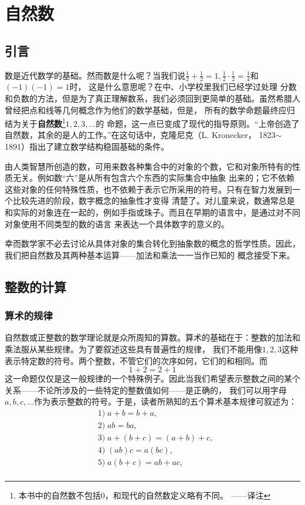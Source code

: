 \chapter{自然数}
\label{chap:natural-number}

\section*{引言}
数是近代数学的基础。然而数是什么呢？当我们说$\frac{1}{2} + \frac{1}{2}= 1,
\frac{1}{2} \cdot \frac{1}{2} = \frac{1}{4}$和$(-1)(-1) = 1$时，
这是什么意思呢？在中、小学校里我们已经学过处理
分数和负数的方法，但是为了真正理解数系，我们必须回到更简单的基础。虽然希腊人曾经把点和线等几何概念作为他们的数学基础，但是，
所有的数学命题最终应归结为关于\textbf{自然数}\footnote{本书中的自然数不包括0，和现代的自然数定义略有不同。
——译注}$1,2,3,\ldots$的
命题，这一点已变成了现代的指导原则。“上帝创造了自然数，其余的是人的工作。”在这句话中，克隆尼克（L. Kronecker，
1823$\sim$1891）指出了建立数学结构稳固基础的条件。

由人类智慧所创造的数，可用来数各种集合中的对象的个数，它和对象所特有的性质无关。例如数“六”是从所有包含六个东西的实际集合中抽象
出来的；它不依赖这些对象的任何特殊性质，也不依赖于表示它所采用的符号。只有在智力发展到一个比较先进的阶段，数字概念的抽象性才变得
清楚了。对儿童来说，数通常总是和实际的对象连在一起的，例如手指或珠子。而且在早期的语言中，是通过对不同对象使用不同类型的数的语言
来表达一个具体数字的意义的。

幸而数学家不必去讨论从具体对象的集合转化到抽象数的概念的哲学性质。因此，我们把自然数及其两种基本运算——加法和乘法一一当作已知的
概念接受下来。

\newpage
\section{整数的计算}
\subsection{算术的规律}
自然数或正整数的数学理论就是众所周知的算数。算术的基础在于：整数的加法和乘法服从某些规律。为了要叙述这些具有普遍性的规律，
我们不能用像$1, 2, 3$这种表示特定数的符号。两个整数，不管它们的次序如何，它们的和相同。而
\begin{equation*}
1+2=2+1
\end{equation*}
这一命题仅仅是这一般规律的一个特殊例子。因此当我们希望表示整数之间的某个关系——不论所涉及的一些特定的整数值如何——是正确的，
我们可以用字母$a,b,c,\ldots$作为表示整数的符号。于是，读者所熟知的五个算术基本规律可叙述为：
\begin{equation*}
\begin{split}
&1)\; a+b=b+a,\\
&2)\; ab=ba,\\
&3)\; a+(b+c)=(a+b)+c,\\
&4)\; (ab)c = a(bc),\\
&5)\; a(b+c)=ab+ac,\\
\end{split}
\end{equation*}


